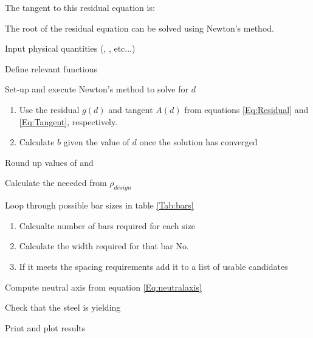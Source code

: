The tangent to this residual equation is:


The root of the residual equation can be solved using Newton's method.


\vfill
\begin{pseudocode}
	\item Input physical quantities (\fc, \fy, etc...)
	\item Define relevant functions
	\item Set-up and execute Newton's method to solve for $d$

	\begin{enumerate}
	\item Use the residual $g(d)$ and tangent $A(d)$ from equations \ref{Eq:Residual} and \ref{Eq:Tangent}, respectively.
	\item Calculate $b$ given the value of $d$ once the solution has converged
	\end{enumerate}

	\item Round up values of \bb and \dd
	\item Calculate the neeeded \As   from $\rho_{design}$

	\item Loop through possible bar sizes in table \ref{Tab:bars}

	\begin{enumerate}
		\item Calcualte number of bars required for each size
		\item Calculate the width required for that bar No.
		\item If it meets the spacing requirements add it to a list of usable candidates
	\end{enumerate}

	\item Compute neutral axis from equation \ref{Eq:neutralaxis}
	\item Check that the steel is yielding
	\item Print and plot results
\end{pseudocode}
\hfill
